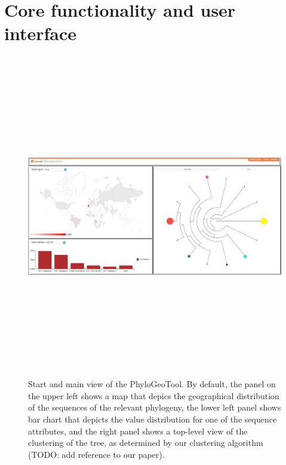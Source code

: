\documentclass[a4paper, 11pt]{article} %
\begin{document}
\section{Core functionality and user interface}




\begin{figure}[H]
\centering
\includegraphics[width=400pt, height=400pt, keepaspectratio=true]{images/initial_view.PNG}
\caption{Start and main view of the PhyloGeoTool. By default, the panel on the upper left shows a map that depics the geographical distribution of the sequences of the relevant phylogeny, the lower left panel shows bar chart that depicts the value distribution for one of the sequence attributes, and the right panel shows a top-level view of the clustering of the tree, as determined by our clustering algorithm (TODO: add reference to our paper).}
\label{fig:initial_view}
\end{figure}
\end{document}
